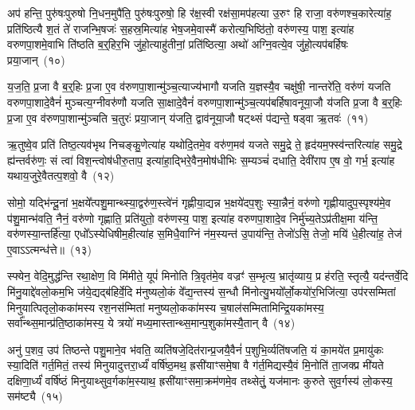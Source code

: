 अप॑ हन्ति॒ पुरु॑षःपुरुषो नि॒धन॒मुपै॑ति॒ पुरु॑षःपुरुषो॒ हि र॑क्ष॒स्वी रक्ष॑सा॒मप॑हत्या उ॒रुꣳ हि राजा॒ वरु॑णश्च॒कारेत्या॑ह॒ प्रति॑ष्ठित्यै श॒तं ते॑ राजन्भि॒षजः॑ स॒हस्र॒मित्या॑ह भेष॒जमे॒वास्मै॑ करोत्य॒भिष्ठि॑तो॒ वरु॑णस्य॒ पाश॒ इत्या॑ह वरुणपा॒शमे॒वाभि ति॑ष्ठति ब॒र्॒\mbox{}हिर॒भि जु॑हो॒त्याहु॑तीनां॒ प्रति॑ष्ठित्या॒ अथो॑ अग्नि॒वत्ये॒व जु॑हो॒त्यप॑बर्\mbox{}हिषः प्रया॒जान्~(१०)\ip

य॒ज॒ति॒ प्र॒जा वै ब॒र्॒\mbox{}हिः प्र॒जा ए॒व व॑रुणपा॒शान्मु॑ञ्च॒त्याज्य॑भागौ यजति य॒ज्ञस्यै॒व चक्षु॑षी॒ नान्तरे॑ति॒ वरु॑णं यजति वरुणपा॒शादे॒वैनं॑ मुञ्चत्य॒ग्नीवरु॑णौ यजति सा॒क्षादे॒वैनं॑ वरुणपा॒शान्मु॑ञ्च॒त्यप॑बर्\mbox{}हिषावनूया॒जौ य॑जति प्र॒जा वै ब॒र्॒\mbox{}हिः प्र॒जा ए॒व व॑रुणपा॒शान्मु॑ञ्चति च॒तुरः॑ प्रया॒जान् य॑जति॒ द्वाव॑नूया॒जौ षट्थ्सं प॑द्यन्ते॒ षड्वा ऋ॒तवः॑~(११)\ip

ऋ॒तुष्वे॒व प्रति॑ तिष्ठ॒त्यव॑भृथ निचङ्कु॒णेत्या॑ह यथोदि॒तमे॒व वरु॑ण॒मव॑ यजते समु॒द्रे ते॒ हृद॑यम॒फ्स्व॑न्तरित्या॑ह समु॒द्रे ह्य॑न्तर्वरु॑णः॒ सं त्वा॑ विश॒न्त्वोष॑धीरु॒ताप॒ इत्या॑हा॒द्भिरे॒वैन॒मोष॑धीभिः स॒म्यञ्चं॑ दधाति॒ देवी॑राप ए॒ष वो॒ गर्भ॒ इत्या॑ह यथाय॒जुरे॒वैतत्प॒शवो॒ वै~(१२)\ip

सोमो॒ यद्भि॑न्दू॒नां भ॒क्षये᳚त्पशु॒मान्थ्स्या॒द्वरु॑ण॒स्त्वे॑नं गृह्णीया॒द्यन्न भ॒क्षये॑दप॒शुः स्या॒न्नैनं॒ वरु॑णो गृह्णीयादुप॒स्पृश्य॑मे॒व प॑शु॒मान्भ॑वति॒ नैनं॒ वरु॑णो गृह्णाति॒ प्रति॑युतो॒ वरु॑णस्य॒ पाश॒ इत्या॑ह वरुणपा॒शादे॒व निर्मु॑च्य॒ते\-ऽप्र॑तीक्ष॒मा य॑न्ति॒ वरु॑णस्या॒न्तर्\mbox{}हि॑त्या॒ एधो᳚\-ऽस्येधिषीम॒हीत्या॑ह स॒मिधै॒वाग्निं न॑म॒स्यन्त॑ उ॒पाय॑न्ति॒ तेजो॑\-ऽसि॒ तेजो॒ मयि॑ धे॒हीत्या॑ह॒ तेज॑ ए॒वा\-ऽऽ\-त्मन्ध॑त्ते॥~(१३)\ip

{\anuvakamend[{रक्षाꣳ॑सि प्रया॒जानृ॒तवो॒ वै न॑म॒स्यन्तो॒ द्वाद॑श च}]}

स्फ्येन॒ वेदि॒मुद्ध॑न्ति रथा॒क्षेण॒ वि मि॑मीते॒ यूपं॑ मिनोति त्रि॒वृत॑मे॒व वज्रꣳ॑ स॒म्भृत्य॒ भ्रातृ॑व्याय॒ प्र ह॑रति॒ स्तृत्यै॒ यद॑न्तर्वे॒दि मि॑नु॒याद्दे॑वलो॒कम॒भि ज॑ये॒द्यद्ब॑हिर्वे॒दि म॑नुष्यलो॒कं वे᳚द्य॒न्तस्य॑ स॒न्धौ मि॑नोत्यु॒भयो᳚र्लो॒कयो॑र॒भिजि॑त्या॒ उप॑रसम्मितां मिनुयात्पितृलो॒कका॑मस्य रश॒नस॑म्मितां मनुष्यलो॒कका॑मस्य च॒षाल॑सम्मितामिन्द्रि॒यका॑मस्य॒ सर्वा᳚न्थ्स॒मान्प्र॑ति॒ष्ठाका॑मस्य॒ ये त्रयो॑ मध्य॒मास्तान्थ्स॒मान्प॒शुका॑मस्यै॒तान् वै~(१४)\ip

अनु॑ प॒शव॒ उप॑ तिष्ठन्ते पशु॒माने॒व भ॑वति॒ व्यति॑षजे॒दित॑रान्प्र॒जयै॒वैनं॑ प॒शुभि॒र्व्यति॑षजति॒ यं का॒मये॑त प्र॒मायु॑कः स्या॒दिति॑ गर्त॒मितं॒ तस्य॑ मिनुयादुत्तरा॒र्ध्यं॑ वर्\mbox{}षि॑ष्ठ॒मथ॒ ह्रसी॑याꣳसमे॒षा वै ग॑र्त॒मिद्यस्यै॒वं मि॒नोति॑ ता॒जक्प्र मी॑यते दक्षिणा॒र्ध्यं॑ वर्\mbox{}षि॑ष्ठं मिनुयाथ्सुव॒र्गका॑म॒स्याथ॒ ह्रसी॑याꣳसमा॒क्रम॑णमे॒व तथ्सेतुं॒ यज॑मानः कुरुते सुव॒र्गस्य॑ लो॒कस्य॒ सम॑ष्ट्यै~(१५)\ip


